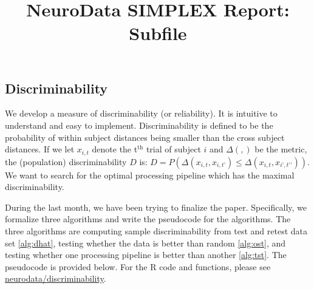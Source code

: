 \documentclass[simplex.tex]{subfiles}
\title{NeuroData SIMPLEX Report: Subfile}
\begin{document}

\subsection{Discriminability}

We develop a measure of discriminability (or reliability).  It
is intuitive to understand and easy to implement.
Discriminability is defined to be the probability of within
subject distances being smaller than the cross subject
distances. If we let $x_{i,t}$ denote the t$^{\text{th}}$ trial of subject 
$i$ and $\Delta(,)$ be the metric, the (population) discriminability $D$
is: $D= P (\Delta(x_{i,t} , x_{i,t’}) \leq  \Delta(x_{i,t} , x_{i’,t’’}))$.
We want to search for the optimal processing pipeline which has the
maximal discriminability. 

During the last month, we have been trying to finalize the paper. Specifically, we formalize three algorithms and write the pseudocode for the algorithms. The three algorithms are computing sample discriminability from test and retest data set \ref{alg:dhat}, testing whether the data is better than random \ref{alg:ost}, and testing whether one processing pipeline is better than another \ref{alg:tst}. The pseudocode is provided below. For the R code and functions, please see \href{http://https://github.com/neurodata/discriminability}{neurodata/discriminability}.
\end{document}
